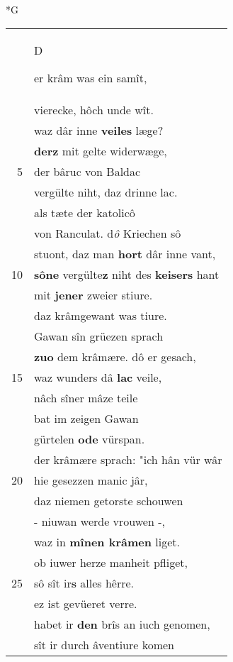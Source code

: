 \documentclass[8pt,a4paper,notitlepage]{article}
\begin{document}
\begin{table}[ht]
\begin{minipage}[t]{0.5\linewidth}
\small
\begin{center}*G
\end{center}
\begin{tabular}{rl}
 & \begin{large}D\end{large}er krâm was ein samît,\\ 
 & vierecke, hôch unde wît.\\ 
 & waz dâr inne \textbf{veiles} læge?\\ 
 & \textbf{derz} mit gelte widerwæge,\\ 
5 & der bâruc von Baldac\\ 
 & vergülte niht, daz drinne lac.\\ 
 & als tæte der katolicô\\ 
 & von Ranculat. d\textit{ô} Kriechen sô\\ 
 & stuont, daz man \textbf{hort} dâr inne vant,\\ 
10 & \textbf{sô}\textbf{ne} vergülte\textbf{z} niht des \textbf{keisers} hant\\ 
 & mit \textbf{jener} zweier stiure.\\ 
 & daz krâmgewant was tiure.\\ 
 & Gawan sîn grüezen sprach\\ 
 & \textbf{zuo} dem krâmære. dô er gesach,\\ 
15 & waz wunders dâ \textbf{lac} veile,\\ 
 & nâch sîner mâze teile\\ 
 & bat im zeigen Gawan\\ 
 & gürtelen \textbf{ode} vürspan.\\ 
 & der krâmære sprach: "ich hân vür wâr\\ 
20 & hie gesezzen manic jâr,\\ 
 & daz niemen getorste schouwen\\ 
 & - niuwan werde vrouwen -,\\ 
 & waz in \textbf{mînen krâmen} liget.\\ 
 & ob iuwer herze manheit pfliget,\\ 
25 & sô sît ir\textbf{s} alles hêrre.\\ 
 & ez ist gevüeret verre.\\ 
 & habet ir \textbf{den} brîs an iuch genomen,\\ 
 & sît ir durch âventiure komen\\ 

\end{tabular}
\end{minipage}
\end{table}
\end{document}
